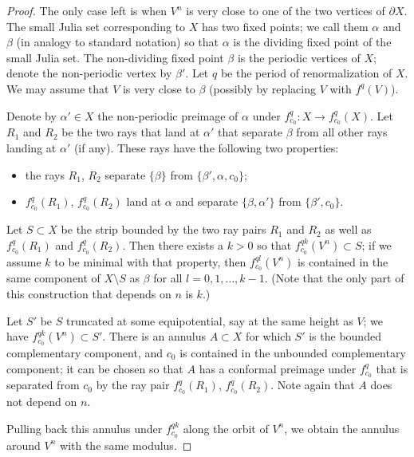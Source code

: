 \documentclass[12pt,a4paper]{amsart}
\newcommand{\sm}{\setminus}
\begin{document}
\begin{proof}
The only case left is when $V^{n}$ is very close to one of the two
vertices of $\partial X$. The small Julia set corresponding to $X$
has two fixed points; we call them $\alpha$ and $\beta$ (in analogy
to standard notation) so that $\alpha$ is the dividing fixed point
of the small Julia set. The non-dividing fixed point $\beta$ is the
periodic vertices of $X$; denote the non-periodic vertex by
$\beta'$. Let $q$ be the period of renormalization of $X$. We may
assume that $V$ is very close to $\beta$ (possibly by replacing $V$
with $f^q(V)$).



Denote by $\alpha'\in X$ the non-periodic preimage of $\alpha$ under
$f_{c_0}^q:X\rightarrow f_{c_0}^q(X)$. Let $R_1$ and $R_2$ be the
two rays that land at $\alpha'$ that separate $\beta$ from all other
rays landing at $\alpha'$ (if any). These rays have the following
two properties:
   \begin{itemize}
\item the rays $R_1$, $ R_2$ separate $\{\beta\}$ from $\{\beta',\alpha,c_0\}$;

\item

$f_{c_0}^q(R_1)$, $f_{c_0}^q(R_2)$ land at $\alpha$ and separate
$\{\beta, \alpha' \}$ from $\{\beta', c_0\}$.
\end{itemize}

Let $S\subset X$ be the strip bounded by the two ray pairs $R_1$ and
$R_2$ as well as $f_{c_0}^q(R_1)$ and $f_{c_0}^q(R_2)$. Then there
exists a $k>0$ so that $f_{c_0}^{qk}(V^{n})\subset S$; if we assume
$k$ to be minimal with that property, then $f_{c_0}^{ql}(V^{n})$ is
contained in the same component of $X\sm S$ as $\beta$
 for all $l=0,1,\dots,k-1$. (Note that the only part of this construction that depends on $n$ is $k$.)



Let $S'$ be $S$ truncated at some equipotential, say at the same
height as $V$; we have $f_{c_0}^{qk}(V^{n})\subset S'$. There is an
annulus $A\subset X$ for which $S'$ is the bounded complementary
component, and $c_0$ is contained in the unbounded complementary
component; it can be chosen so that $A$ has a conformal preimage
under $f_{c_0}^{q}$ that is separated from $c_0$ by the ray pair
$f_{c_0}^q(R_1)$, $f_{c_0}^q(R_2)$. Note again that $A$ does not
depend on $n$.

Pulling back this annulus under $f_{c_0}^{qk}$ along the orbit of
$V^{n}$, we obtain the annulus around $V^{n}$ with the same modulus.
\end{proof}
\end{document}
